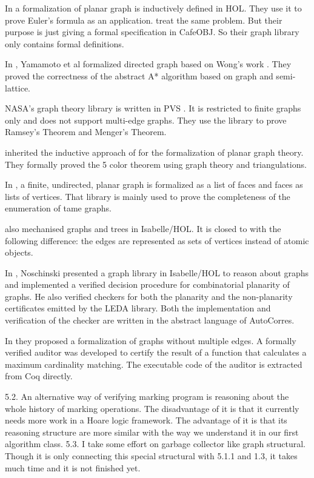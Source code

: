 In \cite{yamamoto1995formalization} a formalization of planar graph is
inductively defined in HOL. They use it to prove Euler's formula as an
application. \cite{tamai2000formal} treat the same problem. But their
purpose is just giving a formal specification in CafeOBJ. So their
graph library only contains formal definitions.

In \cite{yamamoto1998formalization}, Yamamoto et al formalized
directed graph based on Wong's work \cite{wong1991}. They proved the
correctness of the abstract A* algorithm based on graph and
semi-lattice. \cite{tamai2000formal}

NASA's graph theory library is written in PVS
\cite{R.W.:1998:PGT:886490}. It is restricted to finite graphs only
and does not support multi-edge graphs. They use the library to prove
Ramsey's Theorem and Menger's Theorem.

\cite{bauer20025} inherited the inductive approach of
\cite{yamamoto1995formalization} for the formalization of planar graph
theory. They formally proved the 5 color theorem using graph theory
and triangulations.

In \cite{nipkow2006flyspeck}, a finite, undirected, planar graph is
formalized as a list of faces and faces as lists of vertices. That
library is mainly used to prove the completeness of the enumeration of
tame graphs.

\cite{ridge2005graphs} also mechanised graphs and trees in
Isabelle/HOL. It is closed to \cite{wong1991} with the following
difference: the edges are represented as sets of vertices instead of
atomic objects.

In \cite{noschinski2015formalizing}, Noschinski presented a graph
library in Isabelle/HOL to reason about graphs and implemented a
verified decision procedure for combinatorial planarity of graphs. He
also verified checkers for both the planarity and the non-planarity
certificates emitted by the LEDA library. Both the implementation and
verification of the checker are written in the abstract language of
AutoCorres.

In \cite{dubois2015graphes} they proposed a formalization of graphs
without multiple edges. A formally verified auditor was developed to
certify the result of a function that calculates a maximum cardinality
matching. The executable code of the auditor is extracted from Coq
directly.

{\color{magenta}
5.2. An alternative way of verifying marking program is reasoning about the whole history of marking operations. The disadvantage of it is that it currently needs more work in a Hoare logic framework. The advantage of it is that its reasoning structure are more similar with the way we understand it in our first algorithm class.
5.3. I take some effort on garbage collector like graph structural. Though it is only connecting this special structural with 5.1.1 and 1.3, it takes much time and it is not finished yet.}

